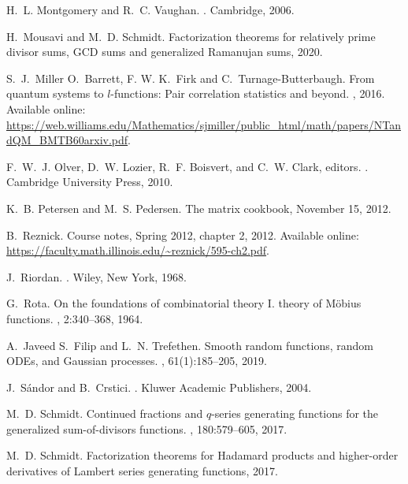 \documentclass[12pt,reqno,a4letter]{article}
\numberwithin{figure}{section}
\numberwithin{table}{section}
\numberwithin{equation}{section}
\theoremstyle{plain}
\numberwithin{theorem}{section}
\theoremstyle{definition}
\begin{document}
\begin{thebibliography}{10}
H.~L. Montgomery and R.~C. Vaughan.
.
\newblock Cambridge, 2006.

H.~Mousavi and M.~D. Schmidt.
\newblock Factorization theorems for relatively prime divisor sums, {GCD} sums
  and generalized {R}amanujan sums, 2020.

S.~J.~Miller O.~Barrett, F. W. K.~Firk and C.~Turnage-Butterbaugh.
\newblock From quantum systems to $l$-functions: Pair correlation statistics
  and beyond.
, 2016.
\newblock Available online:
  \url{https://web.williams.edu/Mathematics/sjmiller/public_html/math/papers/NTandQM_BMTB60arxiv.pdf}.

F.~W.~J. Olver, D.~W. Lozier, R.~F. Boisvert, and C.~W. Clark, editors.
.
\newblock Cambridge University Press, 2010.

K.~B. Petersen and M.~S. Pedersen.
\newblock The matrix cookbook, November 15, 2012.

B.~Reznick.
\newblock Course notes, {S}pring 2012, chapter 2, 2012.
\newblock Available online:
  \url{https://faculty.math.illinois.edu/~reznick/595-ch2.pdf}.

J.~Riordan.
.
\newblock Wiley, New York, 1968.

G.~Rota.
\newblock On the foundations of combinatorial theory {I}. theory of
  {M}{\"{o}}bius functions.
, 2:340--368, 1964.

A.~Javeed S.~Filip and L.~N. Trefethen.
\newblock Smooth random functions, random {O}{D}{E}s, and {G}aussian processes.
, 61(1):185--205, 2019.

J.~S\'{a}ndor and B.~Crstici.
.
\newblock Kluwer Academic Publishers, 2004.

M.~D. Schmidt.
\newblock Continued fractions and $q$-series generating functions for the
  generalized sum-of-divisors functions.
, 180:579--605, 2017.

M.~D. Schmidt.
\newblock Factorization theorems for {H}adamard products and higher-order
  derivatives of {L}ambert series generating functions, 2017.


\end{thebibliography}
\end{document}
